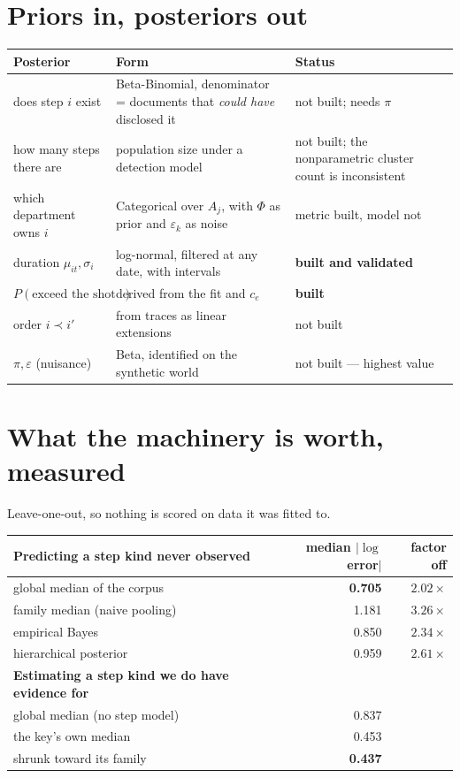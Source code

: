\documentclass[11pt]{article}
\begin{document}
\section{Priors in, posteriors out}

\begin{table}[h]\centering\small
\begin{tabular}{@{}p{5.4cm}p{4.2cm}p{5.2cm}@{}}
\toprule
\textbf{Posterior} & \textbf{Form} & \textbf{Status} \\
\midrule
does step $i$ exist & Beta-Binomial, denominator = documents that \emph{could have} disclosed it &
not built; needs $\pi$ \\
how many steps there are & population size under a detection model & not built; the nonparametric
cluster count is inconsistent \\
which department owns $i$ & Categorical over $A_j$, with $\Phi$ as prior and $\varepsilon_k$ as noise &
metric built, model not \\
duration $\mu_{it},\sigma_i$ & log-normal, filtered at any date, with intervals & \textbf{built and
validated} \\
$P(\text{exceed the shot clock})$ & derived from the fit and $c_e$ & \textbf{built} \\
order $i\prec i'$ & from traces as linear extensions & not built \\
$\pi,\varepsilon$ (nuisance) & Beta, identified on the synthetic world & not built --- highest value \\
\bottomrule
\end{tabular}
\end{table}

\section{What the machinery is worth, measured}

Leave-one-out, so nothing is scored on data it was fitted to.

\begin{table}[h]\centering\small
\begin{tabular}{@{}lrr@{}}
\toprule
\textbf{Predicting a step kind never observed} & median $|\log$ error$|$ & factor off \\
\midrule
global median of the corpus & \textbf{0.705} & $2.02\times$ \\
family median (naive pooling) & 1.181 & $3.26\times$ \\
empirical Bayes & 0.850 & $2.34\times$ \\
hierarchical posterior & 0.959 & $2.61\times$ \\
\midrule
\textbf{Estimating a step kind we do have evidence for} & & \\
\midrule
global median (no step model) & 0.837 & \\
the key's own median & 0.453 & \\
shrunk toward its family & \textbf{0.437} & \\
\bottomrule
\end{tabular}
\end{table}
\end{document}
